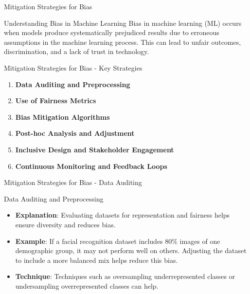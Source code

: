\documentclass[aspectratio=169]{beamer}
\begin{document}
\begin{frame}[fragile]{Mitigation Strategies for Bias}
    \begin{block}{Understanding Bias in Machine Learning}
        Bias in machine learning (ML) occurs when models produce systematically prejudiced results due to erroneous assumptions in the machine learning process. This can lead to unfair outcomes, discrimination, and a lack of trust in technology.
    \end{block}
\end{frame}

\begin{frame}[fragile]{Mitigation Strategies for Bias - Key Strategies}
    \begin{enumerate}
        \item \textbf{Data Auditing and Preprocessing}
        \item \textbf{Use of Fairness Metrics}
        \item \textbf{Bias Mitigation Algorithms}
        \item \textbf{Post-hoc Analysis and Adjustment}
        \item \textbf{Inclusive Design and Stakeholder Engagement}
        \item \textbf{Continuous Monitoring and Feedback Loops}
    \end{enumerate}
\end{frame}

\begin{frame}[fragile]{Mitigation Strategies for Bias - Data Auditing}
    \begin{block}{Data Auditing and Preprocessing}
        \begin{itemize}
            \item \textbf{Explanation}: Evaluating datasets for representation and fairness helps ensure diversity and reduces bias.
            \item \textbf{Example}: If a facial recognition dataset includes 80\% images of one demographic group, it may not perform well on others. Adjusting the dataset to include a more balanced mix helps reduce this bias.
            \item \textbf{Technique}: Techniques such as oversampling underrepresented classes or undersampling overrepresented classes can help.
        \end{itemize}
    \end{block}
\end{frame}
\end{document}
